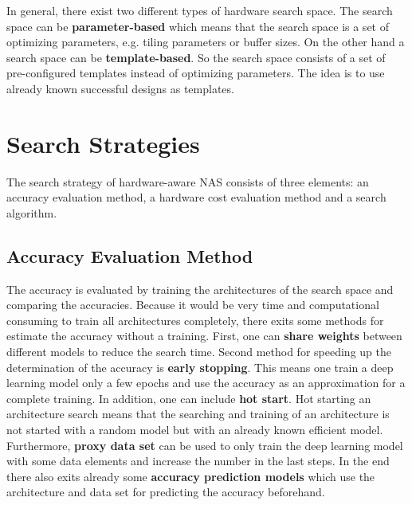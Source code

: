 \documentclass[conference]{IEEEtran}
\begin{document}
In general, there exist two different types of hardware search space. The search space can be \textbf{parameter-based} which means that the search space is a set of optimizing parameters, e.g. tiling parameters or buffer sizes. On the other hand a search space can be \textbf{template-based}. So the search space consists of a set of pre-configured templates instead of optimizing parameters. The idea is to use already known successful designs as templates.

\section{Search Strategies}
\label{section:SearchStrategy}

The search strategy of hardware-aware NAS consists of three elements: an accuracy evaluation method, a hardware cost evaluation method and a search algorithm. 

\subsection{Accuracy Evaluation Method}
The accuracy is evaluated by training the architectures of the search space and comparing the accuracies. Because it would be very time and computational consuming to train all architectures completely, there exits some methods for estimate the accuracy without a training. First, one can  \textbf{share weights} between different models to reduce the search time. Second method for speeding up the determination of the accuracy is \textbf{early stopping}. This means one train a deep learning model only a few epochs and use the accuracy as an approximation for a complete training. In addition, one can include \textbf{hot start}. Hot starting an architecture search means that the searching and training of an architecture is not started with a random model but with an already known efficient model. Furthermore, \textbf{proxy data set} can be used to only train the deep learning model with some data elements and increase the number in the last steps. In the end there also exits already some \textbf{accuracy prediction models} which use the architecture and data set for predicting the accuracy beforehand. 
\end{document}
